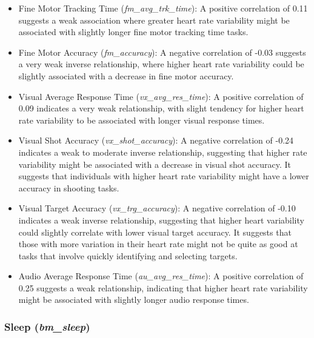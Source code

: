 \begin{itemize}
    \item Fine Motor Tracking Time (\textit{fm\_avg\_trk\_time}): A positive correlation of 0.11 suggests a weak association where greater heart rate variability
          might be associated with slightly longer fine motor tracking time tasks.

    \item Fine Motor Accuracy (\textit{fm\_accuracy}): A negative correlation of -0.03 suggests a very weak inverse relationship, where higher heart rate variability
          could be slightly associated with a decrease in fine motor accuracy.

    \item Visual Average Response Time (\textit{vx\_avg\_res\_time}): A positive correlation of 0.09 indicates a very weak relationship, with slight tendency for
          higher heart rate variability to be associated with longer visual response times.

    \item Visual Shot Accuracy (\textit{vx\_shot\_accuracy}): A negative correlation of -0.24 indicates a weak to moderate inverse relationship, suggesting that
          higher rate variability might be associated with a decrease in visual shot accuracy. It suggests that individuals with higher heart rate variability might
          have a lower accuracy in shooting tasks.

    \item Visual Target Accuracy (\textit{vx\_trg\_accuracy}): A negative correlation of -0.10 indicates a weak inverse relationship, suggesting that higher heart
          variability could slightly correlate with lower visual target accuracy. It suggests that those with more variation in their heart rate might not be quite as good
          at tasks that involve quickly identifying and selecting targets.

    \item Audio Average Response Time (\textit{au\_avg\_res\_time}): A positive correlation of 0.25 suggests a weak relationship, indicating that higher heart rate
          variability might be associated with slightly longer audio response times.

\end{itemize}


\subsubsection*{Sleep (\textit{bm\_sleep})}

